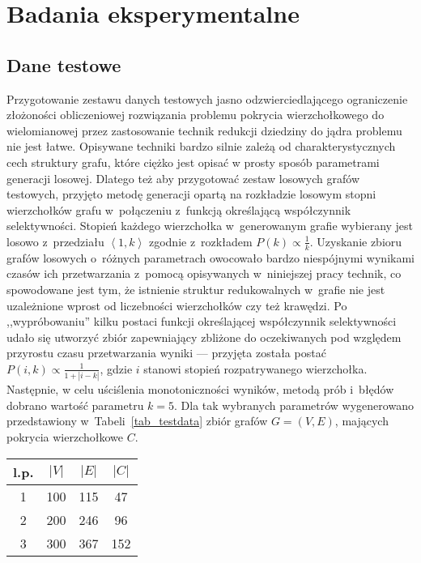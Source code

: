 \chapter{Badania eksperymentalne}
\label{results}
\section{Dane testowe}
\par{
  Przygotowanie zestawu danych testowych jasno odzwierciedlającego ograniczenie złożoności obliczeniowej rozwiązania problemu pokrycia wierzchołkowego do wielomianowej przez zastosowanie technik redukcji dziedziny do jądra problemu nie jest łatwe.
  Opisywane techniki bardzo silnie zależą od charakterystycznych cech struktury grafu, które ciężko jest opisać w prosty sposób parametrami generacji losowej.
  Dlatego też aby przygotować zestaw losowych grafów testowych, przyjęto metodę generacji opartą na rozkładzie losowym stopni wierzchołków grafu w~połączeniu z~funkcją określającą współczynnik selektywności.
  Stopień każdego wierzchołka w~generowanym grafie wybierany jest losowo z~przedziału $\left<1, k\right>$ zgodnie z~rozkładem $P(k) \propto \frac{1}{k}$.
  Uzyskanie zbioru grafów losowych o~różnych parametrach owocowało bardzo niespójnymi wynikami czasów ich przetwarzania z~pomocą opisywanych w~niniejszej pracy technik, co spowodowane jest tym, że istnienie struktur redukowalnych w~grafie nie jest uzależnione wprost od liczebności wierzchołków czy też krawędzi.
  Po ,,wypróbowaniu'' kilku postaci funkcji określającej współczynnik selektywności udało się utworzyć zbiór zapewniający zbliżone do oczekiwanych pod względem przyrostu czasu przetwarzania wyniki --- przyjęta została postać $P(i, k) \propto \frac{1}{1+|i-k|}$, gdzie $i$ stanowi stopień rozpatrywanego wierzchołka.
  Następnie, w celu uściślenia monotoniczności wyników, metodą prób i~błędów dobrano wartość parametru $k=5$.
  Dla tak wybranych parametrów wygenerowano przedstawiony w~Tabeli~\ref{tab_testdata} zbiór grafów $G=(V, E)$, mających pokrycia wierzchołkowe $C$.\\
  \begin{table}
    \begin{center}
    \begin{tabular}{| c | c | c | c |}
      \hline
      l.p. & $|V|$ & $|E|$ & $|C|$ \\ \hline
      1 & 100 & 115 & 47 \\
      2 & 200 & 246 & 96 \\
      3 & 300 & 367 & 152 \\

\end{tabular}
\end{center}
\end{table}}
